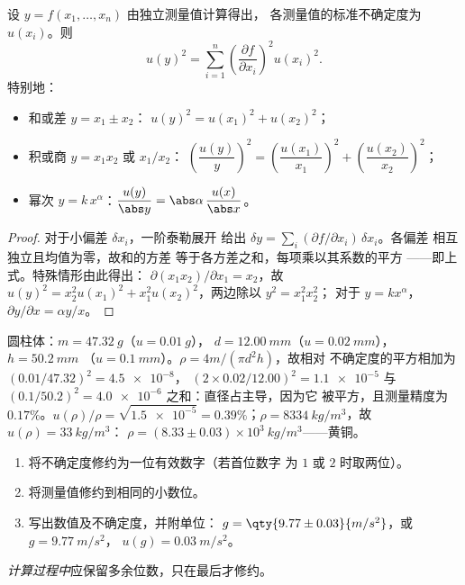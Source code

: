 \begin{theorem}[合成不确定度]\label{thm:b1:units-dimensions:propagation}
设 $y = f(x_1, \dots, x_n)$ 由独立测量值计算得出，
各测量值的标准不确定度为 $u(x_i)$。则
\[
u(y)^2 = \sum_{i=1}^n \left(\frac{\partial f}{\partial x_i}\right)^2 u(x_i)^2 .
\]
特别地：
\begin{itemize}
  \item 和或差 $y = x_1 \pm x_2$：
        $u(y)^2 = u(x_1)^2 + u(x_2)^2$；
  \item 积或商 $y = x_1 x_2$ 或 $x_1/x_2$：
        $\left(\dfrac{u(y)}{y}\right)^2 = \left(\dfrac{u(x_1)}{x_1}\right)^2
        + \left(\dfrac{u(x_2)}{x_2}\right)^2$；
  \item 幂次 $y = k\,x^\alpha$：$\dfrac{u(y)}{\abs y} = \abs\alpha\,\dfrac{u(x)}{\abs x}$。
\end{itemize}
\end{theorem}

\begin{proof}
对于小偏差 $\delta x_i$，一阶泰勒展开
给出 $\delta y = \sum_i (\partial f/\partial x_i)\,\delta x_i$。各偏差
相互独立且均值为零，故和的方差
等于各方差之和，每项乘以其系数的平方
——即上式。特殊情形由此得出：
$\partial(x_1 x_2)/\partial x_1 = x_2$，故
$u(y)^2 = x_2^2 u(x_1)^2 + x_1^2 u(x_2)^2$，两边除以 $y^2 = x_1^2 x_2^2$；
对于 $y = kx^\alpha$，$\partial y/\partial x = \alpha y/x$。
\end{proof}

\begin{example}[圆柱体的密度]\label{ex:b1:units-dimensions:density}
圆柱体：$m = \qty{47.32}{g}$（$u = \qty{0.01}{g}$），
$d = \qty{12.00}{mm}$（$u = \qty{0.02}{mm}$），$h = \qty{50.2}{mm}$
（$u = \qty{0.1}{mm}$）。$\rho = 4m/(\pi d^2 h)$，故相对
不确定度的平方相加为 $(0.01/47.32)^2 = \num{4.5e-8}$，
$(2 \times 0.02/12.00)^2 = \num{1.1e-5}$ 与
$(0.1/50.2)^2 = \num{4.0e-6}$ 之和：直径占主导，因为它
被平方，且测量精度为 $0.17\%$。$u(\rho)/\rho = \sqrt{\num{1.5e-5}}
= 0.39\%$；$\rho = \qty{8334}{kg/m^3}$，故 $u(\rho) = \qty{33}{kg/m^3}$：
$\rho = (8.33 \pm 0.03)\times10^3\ \unit{kg/m^3}$——黄铜。
\end{example}

\begin{method}[写出结果]\label{met:b1:units-dimensions:writing}
\begin{enumerate}
  \item 将不确定度修约为一位有效数字（若首位数字
        为 $1$ 或 $2$ 时取两位）。
  \item 将测量值修约到相同的小数位。
  \item 写出数值及不确定度，并附单位：
        $g = \qty{9.77\pm0.03}{m/s^2}$，或 $g = \qty{9.77}{m/s^2}$，
        $u(g) = \qty{0.03}{m/s^2}$。
\end{enumerate}
\emph{计算过程中}应保留多余位数，只在最后才修约。
\end{method}


